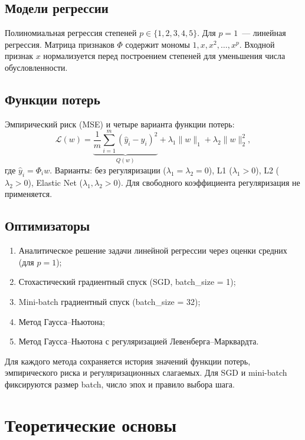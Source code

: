 \documentclass[12pt]{article}
\begin{document}
\subsection*{Модели регрессии}

Полиномиальная регрессия степеней $p \in \{1, 2, 3, 4, 5\}$. Для $p=1$~--- линейная регрессия. Матрица признаков $\Phi$ содержит мономы $1, x, x^2, \ldots, x^p$. Входной признак $x$ нормализуется перед построением степеней для уменьшения числа обусловленности.

\subsection*{Функции потерь}

Эмпирический риск (MSE) и четыре варианта функции потерь:
\[
    \mathcal{L}(w) = \underbrace{\frac{1}{m}\sum_{i=1}^{m}(\hat{y}_i - y_i)^2}_{Q(w)} + \lambda_1 \|w\|_1 + \lambda_2 \|w\|_2^2,
\]
где $\hat{y}_i = \Phi_i w$. Варианты: без регуляризации ($\lambda_1 = \lambda_2 = 0$), L1 ($\lambda_1 > 0$), L2 ($\lambda_2 > 0$), Elastic Net ($\lambda_1, \lambda_2 > 0$). Для свободного коэффициента регуляризация не применяется.

\subsection*{Оптимизаторы}

\begin{enumerate}
    \item Аналитическое решение задачи линейной регрессии через оценки средних (для $p = 1$);
    \item Стохастический градиентный спуск (SGD, batch\_size = 1);
    \item Mini-batch градиентный спуск (batch\_size = 32);
    \item Метод Гаусса--Ньютона;
    \item Метод Гаусса--Ньютона с регуляризацией Левенберга--Марквардта.
\end{enumerate}

Для каждого метода сохраняется история значений функции потерь, эмпирического риска и регуляризационных слагаемых. Для SGD и mini-batch фиксируются размер batch, число эпох и правило выбора шага.

\section{Теоретические основы}
\end{document}
